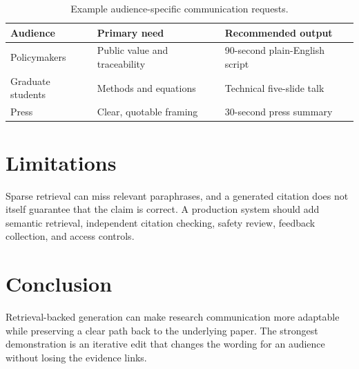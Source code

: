 \documentclass[11pt]{article}
\begin{document}
\begin{table}[h]
\centering
\begin{tabular}{lll}
\toprule
Audience & Primary need & Recommended output \\
\midrule
Policymakers & Public value and traceability & 90-second plain-English script \\
Graduate students & Methods and equations & Technical five-slide talk \\
Press & Clear, quotable framing & 30-second press summary \\
\bottomrule
\end{tabular}
\caption{Example audience-specific communication requests.}
\end{table}

\section{Limitations}
Sparse retrieval can miss relevant paraphrases, and a generated citation does not itself guarantee that the claim is correct. A production system should add semantic retrieval, independent citation checking, safety review, feedback collection, and access controls.

\section{Conclusion}
Retrieval-backed generation can make research communication more adaptable while preserving a clear path back to the underlying paper. The strongest demonstration is an iterative edit that changes the wording for an audience without losing the evidence links.
\end{document}
